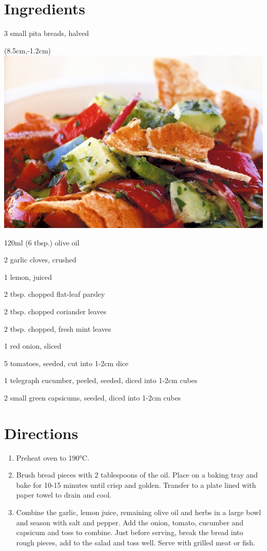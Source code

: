 \section*{Ingredients}
\begin{ingredients-list}
	\item 3 small pita breads, halved
		\begin{textblock*}{8cm}(8.5cm,-1.2cm) %
			\includegraphics[scale=0.35]{./img/fattoush.jpg}
		\end{textblock*}
	\item 120ml (6 tbsp.) olive oil
	\item 2 garlic cloves, crushed
	\item 1 lemon, juiced
	\item 2 tbsp. chopped flat-leaf parsley
	\item 2 tbsp. chopped coriander leaves
	\item 2 tbsp. chopped, fresh mint leaves
	\item 1 red onion, sliced
	\item 5 tomatoes, seeded, cut into 1-2cm dice
	\item 1 telegraph cucumber, peeled, seeded,  diced into 1-2cm cubes
	\item 2 small green capsicums, seeded, diced into 1-2cm cubes
\end{ingredients-list}

\section*{Directions}
\begin{enumerate}
	\item Preheat oven to 190°C.
	\item Brush bread pieces with 2 tablespoons of the oil. Place on a baking tray and bake for 10-15 minutes until crisp and golden.
		Transfer to a plate lined with paper towel to drain and cool.
	\item Combine the garlic, lemon juice, remaining olive oil and herbs in a large bowl and season with salt and pepper.
		Add the onion, tomato, cucumber and capsicum and toss to combine.
		Just before serving, break the bread into rough pieces, add to the salad and toss well. Serve with grilled meat or fish.
\end{enumerate}

